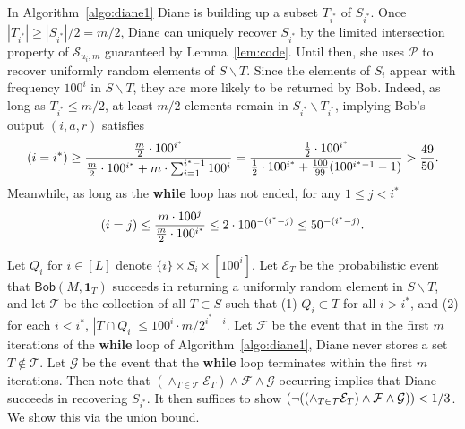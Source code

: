 \documentclass[11pt]{article}
\let\Pr\relax
\DeclareMathOperator*{\Pr}{\mathbb{P}}
\newcommand{\query}{\mathsf{Bob}}
\begin{document}
In Algorithm~\ref{algo:diane1} Diane is building up a subset $T_{i^*}$ of $S_{i^*}$. Once $|T_{i^*}| \ge |S_{i^*}|/2 = m/2$, Diane can uniquely recover $S_{i^*}$ by the limited intersection property of $\mathcal{S}_{u_i,m}$ guaranteed by Lemma~\ref{lem:code}. Until then, she uses $\mathcal P$ to recover uniformly random elements of $S\backslash T$. Since the elements of $S_i$ appear with frequency $100^i$ in $S\backslash T$, they are more likely to be returned by Bob. Indeed, as long as $T_{i^*}\le m/2$, at least $m/2$ elements remain in $S_{i^*}\backslash T_{i^*}$, implying Bob's output $(i,a,r)$ satisfies
\begin{equation}
\Pr(i = i^*) \ge \frac{\frac m2\cdot 100^{i^*}}{\frac m2\cdot 100^{i^*} + m\cdot \sum_{i=1}^{i^*-1} 100^i} = \frac{\frac 12\cdot 100^{i^*}}{\frac 12\cdot 100^{i^*} + \frac {100}{99}(100^{i^*-1} - 1)} > \frac{49}{50} . \label{eqn:istar-likely}
\end{equation}
Meanwhile, as long as the \textbf{while} loop has not ended, for any $1\le j< i^*$
\begin{equation}
\Pr(i = j) \le \frac{m\cdot 100^j}{\frac m2\cdot 100^{i^*}} \le 2\cdot 100^{-(i^*-j)} \le 50^{-(i^*-j)} . \label{eqn:others-unlikely}
\end{equation}

Let $Q_i$ for $i\in [L]$ denote $\{i\} \times S_i \times [100^i]$. Let $\mathcal{E}_T$ be the probabilistic event that $\query(M, \mathbf{1}_T)$ succeeds in returning a uniformly random element in $S\backslash T$, and let $\mathcal{T}$ be the collection of all $T\subset S$ such that (1) $Q_i\subset T$ for all $i>i^*$, and (2) for each $i < i^*$, $|T\cap Q_i| \le 100^i\cdot  m/2^{i^*-i}$. Let $\mathcal{F}$ be the event that in the first $m$ iterations of the \textbf{while} loop of Algorithm~\ref{algo:diane1}, Diane never stores a set $T\notin\mathcal{T}$. Let $\mathcal{G}$ be the event that the \textbf{while} loop terminates within the first $m$ iterations. Then note that $(\wedge_{T\in\mathcal T} \mathcal E_T) \wedge \mathcal F\wedge \mathcal G$ occurring implies that Diane succeeds in recovering $S_{i^*}$. It then suffices to show $\Pr(\neg((\wedge_{T\in\mathcal T} \mathcal E_T) \wedge \mathcal F\wedge \mathcal G)) < 1/3$. We show this via the union bound.

\medskip
\end{document}
